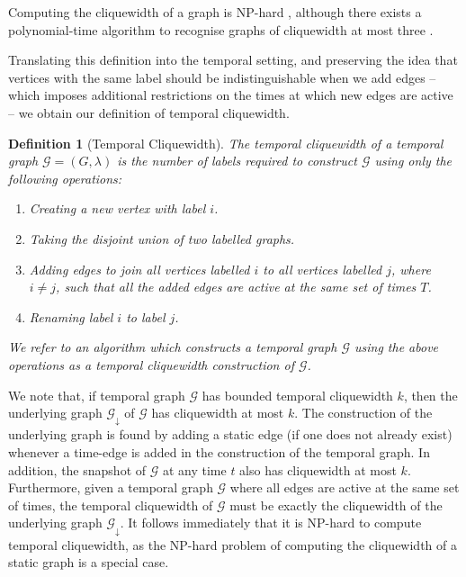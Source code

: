 \documentclass[preprint,12pt]{elsarticle}
\newtheorem{definition}{Definition}
\begin{document}
Computing the cliquewidth of a graph is NP-hard \cite{fellows_clique-width_2009}, although there exists a polynomial-time algorithm to recognise graphs of cliquewidth at most three \cite{corneil_polynomial-time_2012}.

Translating this definition into the temporal setting, and preserving the idea that vertices with the same label should be indistinguishable when we add edges -- which imposes additional restrictions on the times at which new edges are active -- we obtain our definition of temporal cliquewidth.
\begin{definition}[Temporal Cliquewidth]\label{def:temp-cw}
The \emph{temporal cliquewidth} of a temporal graph $\mathcal{G}=(G, \lambda)$ is the number of labels required to construct $\mathcal{G}$ using only the following operations:
    \begin{enumerate}
    \item Creating a new vertex with label $i$.
    \item\label{cliquedisjoint} Taking the disjoint union of two labelled graphs.
    \item Adding edges to join all vertices labelled $i$ to all vertices labelled $j$, where $i \neq j$, such that all the added edges are active at the same set of times $T$.
    \item Renaming label $i$ to label $j$.
\end{enumerate}
We refer to an algorithm which constructs a temporal graph $\mathcal{G}$ using the above operations as a \emph{temporal cliquewidth construction} of $\mathcal{G}$.
\end{definition}
We note that, if temporal graph $\mathcal{G}$ has bounded temporal cliquewidth $k$, then the underlying graph $\mathcal{G}_{\downarrow}$ of $\mathcal{G}$ has cliquewidth at most $k$. The construction of the underlying graph is found by adding a static edge (if one does not already exist) whenever a time-edge is added in the construction of the temporal graph. In addition, the snapshot of $\mathcal{G}$ at any time $t$ also has cliquewidth at most $k$. Furthermore, given a temporal graph $\mathcal{G}$ where all edges are active at the same set of times, the temporal cliquewidth of $\mathcal{G}$ must be exactly the cliquewidth of the underlying graph $\mathcal{G}_{\downarrow}$. It follows immediately that it is NP-hard to compute temporal cliquewidth, as the NP-hard problem of computing the cliquewidth of a static graph \cite{fellows_clique-width_2009} is a special case. 
\end{document}
